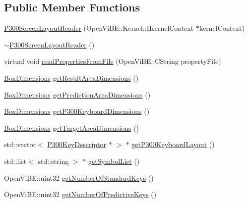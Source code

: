 \subsection*{Public Member Functions}
\begin{DoxyCompactItemize}
\item 
\hyperlink{classOpenViBEApplications_1_1P300ScreenLayoutReader_a92322284277372b4b11fb822bea59d3e}{P300ScreenLayoutReader} (OpenViBE::Kernel::IKernelContext $\ast$kernelContext)
\item 
\hyperlink{classOpenViBEApplications_1_1P300ScreenLayoutReader_adb0d4061746b856b80662a08bc8140af}{$\sim$P300ScreenLayoutReader} ()
\item 
virtual void \hyperlink{classOpenViBEApplications_1_1P300ScreenLayoutReader_a47dc35b731aacc8ef67646324fbc1455}{readPropertiesFromFile} (OpenViBE::CString propertyFile)
\item 
\hyperlink{structOpenViBEApplications_1_1__BoxDimensions}{BoxDimensions} \hyperlink{classOpenViBEApplications_1_1P300ScreenLayoutReader_abf18ece1ba5d5b56ca242d4c790a42a5}{getResultAreaDimensions} ()
\item 
\hyperlink{structOpenViBEApplications_1_1__BoxDimensions}{BoxDimensions} \hyperlink{classOpenViBEApplications_1_1P300ScreenLayoutReader_a93b18bd031bdb47bd039a7484bc4790c}{getPredictionAreaDimensions} ()
\item 
\hyperlink{structOpenViBEApplications_1_1__BoxDimensions}{BoxDimensions} \hyperlink{classOpenViBEApplications_1_1P300ScreenLayoutReader_a0a47e6c340bb500bbad546427d8b9f3b}{getP300KeyboardDimensions} ()
\item 
\hyperlink{structOpenViBEApplications_1_1__BoxDimensions}{BoxDimensions} \hyperlink{classOpenViBEApplications_1_1P300ScreenLayoutReader_ade8f4d42ed4f768a7fe0a0df27d647df}{getTargetAreaDimensions} ()
\item 
std::vector$<$ \hyperlink{classOpenViBEApplications_1_1P300KeyDescriptor}{P300KeyDescriptor} $\ast$ $>$ $\ast$ \hyperlink{classOpenViBEApplications_1_1P300ScreenLayoutReader_a1b9c6668c82d19a45a2ad01d4d6e277e}{getP300KeyboardLayout} ()
\item 
std::list$<$ std::string $>$ $\ast$ \hyperlink{classOpenViBEApplications_1_1P300ScreenLayoutReader_a0c8128de6eb6370e6fbc992bb19ce60a}{getSymbolList} ()
\item 
OpenViBE::uint32 \hyperlink{classOpenViBEApplications_1_1P300ScreenLayoutReader_a8c193af1f162b828920c445b2eec33c7}{getNumberOfStandardKeys} ()
\item 
OpenViBE::uint32 \hyperlink{classOpenViBEApplications_1_1P300ScreenLayoutReader_a0202a216ba56c398633ee24211e55a19}{getNumberOfPredictiveKeys} ()

\end{DoxyCompactItemize}
